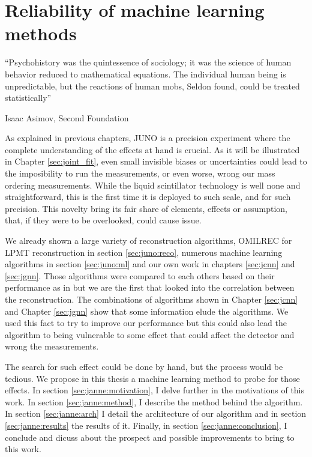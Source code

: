 \documentclass[../main.tex]{subfiles}
\begin{document}
\chapter{Reliability of machine learning methods}
\label{sec:janne}

\epigraph{``Psychohistory was the quintessence of sociology; it was the science of human behavior reduced to mathematical equations. The individual human being is unpredictable, but the reactions of human mobs, Seldon found, could be treated statistically''}{Isaac Asimov, Second Foundation}

\minitoc

As explained in previous chapters, JUNO is a precision experiment where the complete understanding of the effects at hand is crucial. As it will be illustrated in Chapter \ref{sec:joint_fit}, even small invisible biases or uncertainties could lead to the imposibility to run the measurements, or even worse, wrong our mass ordering measurements. While the liquid scintillator technology is well none and straightforward, this is the first time it is deployed to such scale, and for such precision. This novelty bring its fair share of elements, effects or assumption, that, if they were to be overlooked, could cause issue.

We already shown a large variety of reconstruction algorithms, OMILREC for LPMT reconstruction in section \ref{sec:juno:reco}, numerous machine learning algorithms in section \ref{sec:juno:ml} and our own work in chapters \ref{sec:jcnn} and \ref{sec:jgnn}. Those algorithms were compared to each others based on their performance as in \cite{qian_vertex_2021} but we are the first that looked into the correlation between the reconstruction. The combinations of algorithms shown in Chapter \ref{sec:jcnn} and Chapter \ref{sec:jgnn} show that some information elude the algorithms. We used this fact to try to improve our performance but this could also lead the algorithm to being vulnerable to some effect that could affect the detector and wrong the measurements.

The search for such effect could be done by hand, but the process would be tedious. We propose in this thesis a machine learning method to probe for those effects. In section \ref{sec:janne:motivation}, I delve further in the motivations of this work. In section \ref{sec:janne:method}, I describe the method behind the algorithm. In section \ref{sec:janne:arch} I detail the architecture of our algorithm and in section \ref{sec:janne:results} the results of it. Finally, in section \ref{sec:janne:conclusion}, I conclude and dicuss about the prospect and possible improvements to bring to this work.
\end{document}
